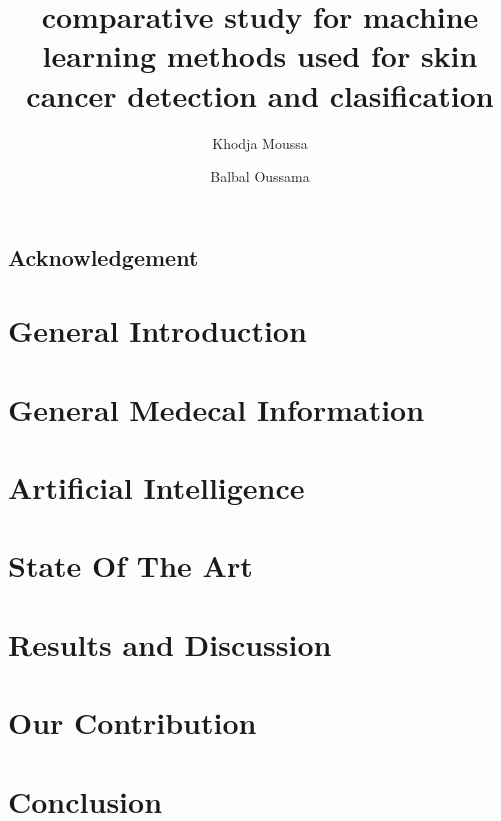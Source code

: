 \documentclass[12pt,a4paper]{report}
\title{comparative study for machine learning methods used for skin cancer detection and clasification}
\author{
	Khodja Moussa
	\and
	Balbal Oussama
}
\date{}
\begin{document}



\section*{Acknowledgement}
\newpage

\tableofcontents
\listoffigures
\listoftables
\newpage


\newpage
\chapter{General Introduction}


\chapter{General Medecal Information}





\chapter{Artificial Intelligence}


\chapter{State Of The Art}


\chapter{Results and Discussion}


\chapter{Our Contribution}


\chapter{Conclusion}




\end{document}
